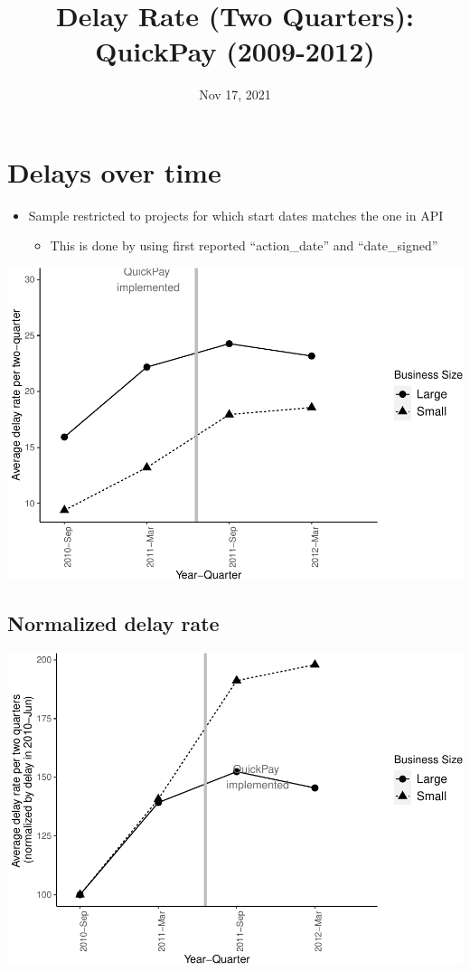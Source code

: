 \documentclass[
]{article}
\title{Delay Rate (Two Quarters): QuickPay (2009-2012)}
\author{}
\date{\vspace{-2.5em}Nov 17, 2021}
\providecommand{\tightlist}{%
  \setlength{\itemsep}{0pt}\setlength{\parskip}{0pt}}
\begin{document}
\maketitle

\hypertarget{delays-over-time}{%
\section{Delays over time}\label{delays-over-time}}

\begin{itemize}
\tightlist
\item
  Sample restricted to projects for which start dates matches the one in
  API

  \begin{itemize}
  \tightlist
  \item
    This is done by using first reported ``action\_date'' and
    ``date\_signed''
  \end{itemize}
\end{itemize}

\includegraphics{qp_first_pc_delay_two_quarters_files/figure-latex/plot_pc_delay-1.pdf}

\hypertarget{normalized-delay-rate}{%
\subsection{Normalized delay rate}\label{normalized-delay-rate}}

\includegraphics{qp_first_pc_delay_two_quarters_files/figure-latex/normalized_plot-1.pdf}
\end{document}
